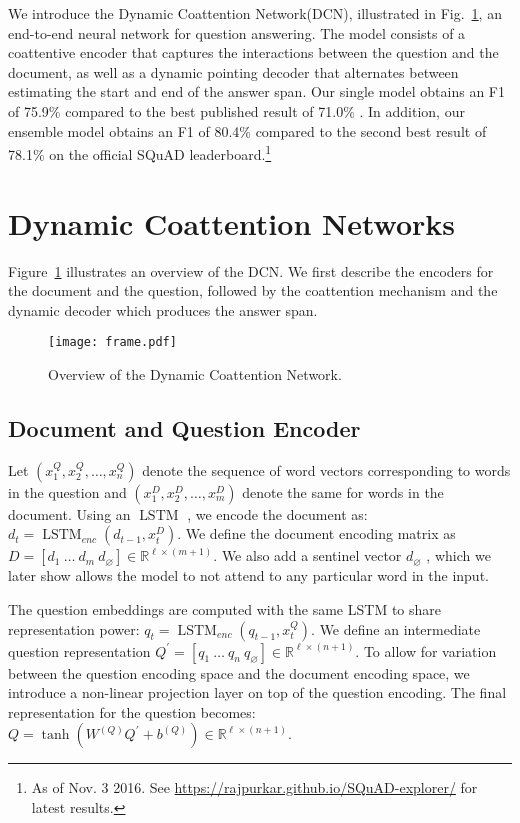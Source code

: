 \documentclass{article} \usepackage{iclr2017_conference,times}
\DeclareMathOperator*{\LSTM}{LSTM}
\newcommand{\squad}{SQuAD\xspace}
\newcommand{\ours}{DCN\xspace}
\newcommand{\oursfull}{Dynamic Coattention Network\xspace}
\newcommand{\testf}{80.4}
\newcommand{\testfsingle}{75.9}
\newcommand{\dhid}{\ell}
\newcommand{\doclen}{m}
\newcommand{\queslen}{n}
\newcommand{\real}[1]{\mathbb{R}^{#1}}
\begin{document}
We introduce the \oursfull (\ours), illustrated in Fig.~\ref{fig:overview}, an end-to-end neural network for question answering.
The model consists of a coattentive encoder that captures the interactions between the question and the document, as well as a dynamic pointing decoder that alternates between estimating the start and end of the answer span.
Our single model obtains an F1 of \testfsingle\% compared to the best published result of 71.0\% \citep{Yu2016}. In addition, our ensemble model obtains an F1 of \testf\% compared to the second best result of 78.1\% on the official \squad leaderboard.\footnote{As of Nov. 3 2016. See \url{https://rajpurkar.github.io/SQuAD-explorer/} for latest results.}


\section{Dynamic Coattention Networks}

Figure~\ref{fig:overview} illustrates an overview of the \ours.
We first describe the encoders for the document and the question, followed by the coattention mechanism and the dynamic decoder which produces the answer span.

\begin{figure}[!ht]
\centering
\texttt{[image: frame.pdf]}
\caption{Overview of the \oursfull.}
\label{fig:overview}
\end{figure}


\subsection{Document and Question Encoder}

Let $(x^Q_1, x^Q_2, \ldots ,x^Q_n)$ denote the sequence of word vectors corresponding to words in the question and $(x^D_1, x^D_2,\ldots,x^D_m)$ denote the same for words in the document.
Using an $\LSTM$ \citep{hochreiter1997long}, we encode the document as:
$d_t = \LSTM_{enc} \left( d_{t-1}, x_t^D \right)$.
We define the document encoding matrix as 
$D = \left[ d_1~  \hdots ~d_m ~ d_\varnothing \right] \in \real{\dhid \times (\doclen + 1)}$.
We also add a sentinel vector $d_\varnothing$ \citep{Merity2016}, which we later show allows the model to not attend to any particular word in the input.

The question embeddings are computed with the same LSTM to share representation power: $q_t = \LSTM_{enc} \left( q_{t-1}, x_t^Q \right)$.
We define an intermediate question representation $Q^\prime = [q_1 ~\ldots~ q_n ~ q_\varnothing] \in \mathbb{R}^{\dhid \times (\queslen+1) }$.
To allow for variation between the question encoding space and the document encoding space, we introduce a non-linear projection layer on top of the question encoding.
The final representation for the question becomes:
$Q = \tanh \left( W^{(Q)} Q^\prime + b^{(Q)} \right) \in \real{\dhid \times (\queslen + 1)}$.
\end{document}
